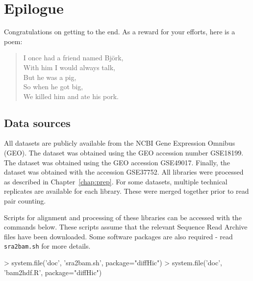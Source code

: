 \documentclass[12pt]{report}
\renewenvironment{Schunk}{\vspace{0pt}}{\vspace{0pt}}
\newcommand{\code}[1]{{\small\texttt{#1}}}
\newenvironment{combox}
{ \begin{shaded}\begin{center}\begin{minipage}[t]{0.95\textwidth} }
{ \end{minipage}\end{center}\end{shaded} }
\begin{document}
\chapter{Epilogue}

\begin{combox}
Congratulations on getting to the end.
As a reward for your efforts, here is a poem:
\begin{quote}
I once had a friend named Bj\"ork, \\
With him I would always talk, \\
But he was a pig, \\
So when he got big, \\
We killed him and ate his pork.
\end{quote}
\end{combox}

\section{Data sources}
All datasets are publicly available from the NCBI Gene Expression Omnibus (GEO).
The \citeauthor{lieberman2009comprehensive} dataset was obtained using the GEO accession number GSE18199.
The \citeauthor{sofueva2013cohesin} dataset was obtained using the GEO accession GSE49017.
Finally, the \citeauthor{rickman2012oncogene} dataset was obtained with the accession GSE37752.
All libraries were processed as described in Chapter~\ref{chap:prep}.
For some datasets, multiple technical replicates are available for each library.
These were merged together prior to read pair counting.

Scripts for alignment and processing of these libraries can be accessed with the commands below.
These scripts assume that the relevant Sequence Read Archive files have been downloaded.
Some software packages are also required - read \code{sra2bam.sh} for more details.

\begin{Schunk}
\begin{Sinput}
> system.file('doc', 'sra2bam.sh', package="diffHic")
> system.file('doc', 'bam2hdf.R', package="diffHic")
\end{Sinput}
\end{Schunk}
\end{document}
